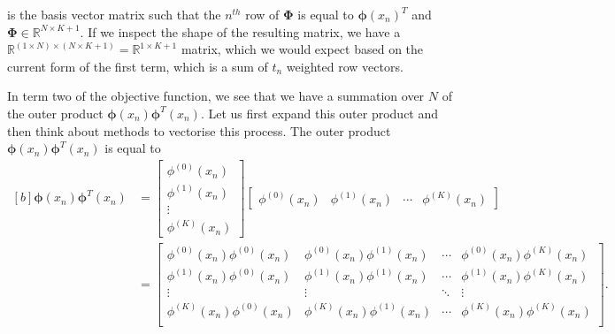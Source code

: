 \documentclass{article}
\begin{document}
is the basis vector matrix such that the $n^{th}$ row of $\boldsymbol\Phi$ is equal to $\boldsymbol\phi(x_n)^T$ and $\boldsymbol\Phi \in \mathbb{R}^{N \times K + 1}$. If we inspect the shape of the resulting matrix, we have a $\mathbb{R}^{(1 \times N) \times (N \times K + 1)} = \mathbb{R}^{1 \times K + 1}$ matrix, which we would expect based on the current form of the first term, which is a sum of $t_n$ weighted row vectors.

In term two of the objective function, we see that we have a summation over $N$ of the outer product $\boldsymbol\phi(x_n) \boldsymbol\phi^T(x_n)$. Let us first expand this outer product and then think about methods to vectorise this process. The outer product $\boldsymbol\phi(x_n) \boldsymbol\phi^T(x_n)$ is equal to
\begin{equation}
\begin{aligned}[b]
\boldsymbol\phi(x_n) \boldsymbol\phi^T(x_n)
&= \begin{bmatrix}
\phi^{(0)}(x_n) \\
\phi^{(1)}(x_n) \\
\vdots \\
\phi^{(K)}(x_n)
\end{bmatrix}
\begin{bmatrix}
\phi^{(0)}(x_n) & \phi^{(1)}(x_n) & \cdots & \phi^{(K)}(x_n)
\end{bmatrix} \\
&= 
\begin{bmatrix}
\phi^{(0)}(x_n)\phi^{(0)}(x_n) & \phi^{(0)}(x_n)\phi^{(1)}(x_n) & \cdots & \phi^{(0)}(x_n)\phi^{(K)}(x_n) \\
\phi^{(1)}(x_n)\phi^{(0)}(x_n) & \phi^{(1)}(x_n)\phi^{(1)}(x_n) & \cdots & \phi^{(1)}(x_n)\phi^{(K)}(x_n) \\
\vdots & \vdots & \ddots & \vdots \\
\phi^{(K)}(x_n)\phi^{(0)}(x_n) & \phi^{(K)}(x_n)\phi^{(1)}(x_n) & \cdots & \phi^{(K)}(x_n)\phi^{(K)}(x_n) \\
\end{bmatrix}.
\end{aligned}
\end{equation}
\end{document}
